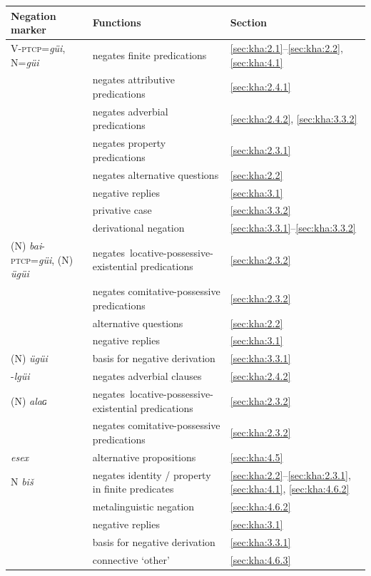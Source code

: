\documentclass[output=paper,colorlinks,citecolor=brown,chinesefont]{langscibook}
\begin{document}
\begin{table}
    \begin{tabularx}{\textwidth}{lQp{20mm}}
\lsptoprule
Negation marker & Functions & Section\\
\midrule 

V-\textsc{ptcp}=\textit{güi}, N=\textit{güi}
& negates finite predications &\ref{sec:kha:2.1}--\ref{sec:kha:2.2}, \ref{sec:kha:4.1}\\
&negates attributive predications & \ref{sec:kha:2.4.1} \\
&negates adverbial predications & \ref{sec:kha:2.4.2}, \ref{sec:kha:3.3.2}\\
&negates property predications & \ref{sec:kha:2.3.1}  \\
&negates alternative questions & \ref{sec:kha:2.2}   \\
& negative replies & \ref{sec:kha:3.1} \\
&privative case & \ref{sec:kha:3.3.2} \\
&derivational negation & \ref{sec:kha:3.3.1}--\ref{sec:kha:3.3.2}  \\

\midrule
(N) \textit{bai}-\textsc{ptcp}=\textit{güi},\newline
    (N) \textit{ügüi}
& \mbox{negates locative-possessive}-existential predications& \ref{sec:kha:2.3.2}\\
& negates comitative{\hyp}possessive predications & \ref{sec:kha:2.3.2}\\
& alternative questions & \ref{sec:kha:2.2}\\
& negative replies &  \ref{sec:kha:3.1}\\

(N) \textit{ügüi} 
& basis for negative derivation & \ref{sec:kha:3.3.1}  \\

\midrule
-\textit{lgüi} 
&  negates adverbial clauses & \ref{sec:kha:2.4.2}  \\

\midrule
(N) \textit{alaɢ}  %
& \mbox{negates locative-possessive}-existential predications & \ref{sec:kha:2.3.2}  \\
& negates comitative-possessive predications & \ref{sec:kha:2.3.2}\\

\midrule
\textit{esex} 
& alternative propositions & \ref{sec:kha:4.5}  \\

\midrule
N \textit{biš} 
& negates identity / property in finite predicates &\ref{sec:kha:2.2}--\ref{sec:kha:2.3.1}, \ref{sec:kha:4.1}, \ref{sec:kha:4.6.2}\\
& metalinguistic negation & \ref{sec:kha:4.6.2}\\
& negative replies & \ref{sec:kha:3.1}\\
&basis for negative derivation  &\ref{sec:kha:3.3.1}\\
&connective ‘other’ & \ref{sec:kha:4.6.3}  \\


\end{tabularx}
\end{table}
\end{document}
